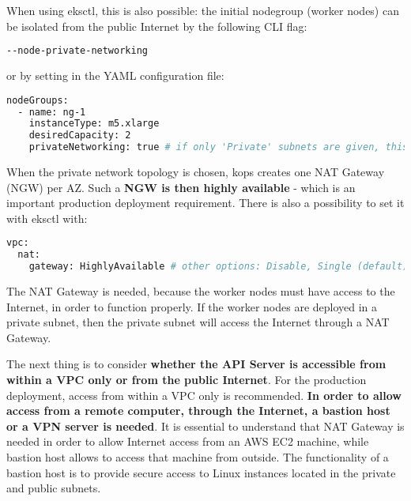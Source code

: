 When using eksctl, this is also possible: the initial nodegroup (worker nodes) can be isolated from the public Internet by the following CLI flag\cite{eksctl-net}:
\begin{lstlisting}[basicstyle=\small,caption={CLI flag used by eksctl to set private networking mode},captionpos=b,language=Bash,xleftmargin=1cm]
--node-private-networking
\end{lstlisting}
or by setting in the YAML configuration file\cite{eks-example}:
\begin{lstlisting}[basicstyle=\small,caption={YAML configuration used by Kops to set private networking mode},captionpos=b,language=Bash,xleftmargin=1cm]
nodeGroups:
  - name: ng-1
    instanceType: m5.xlarge
    desiredCapacity: 2
    privateNetworking: true # if only 'Private' subnets are given, this must be enabled
\end{lstlisting}


When the private network topology is chosen, kops creates one NAT Gateway (NGW) per AZ\cite{kops-net2}. Such a \textbf{NGW is then highly available} - which is an important production deployment requirement. There is also a possibility to set it with eksctl with\cite{eksctl-net}:
\begin{lstlisting}[basicstyle=\small,caption={YAML configuration used by eksctl to set NAT Gateway as Highly Available},captionpos=b,language=Bash,xleftmargin=1cm]
vpc:
  nat:
    gateway: HighlyAvailable # other options: Disable, Single (default)
\end{lstlisting}

The NAT Gateway is needed, because the worker nodes must have access to the Internet, in order to function properly. If the worker nodes are deployed in a private subnet, then the private subnet will access the Internet through a NAT Gateway\cite{eks-net}.


The next thing is to consider \textbf{whether the API Server is accessible from within a VPC only or from the public Internet}. For the production deployment, access from within a VPC only is recommended. \textbf{In order to allow access from a remote computer, through the Internet, a bastion host or a VPN server is needed}\cite{gruntwork-howto}. It is essential to understand that NAT Gateway is needed in order to allow Internet access from an AWS EC2 machine, while bastion host allows to access that machine from outside. The functionality of a bastion host is to provide secure access to Linux instances located in the private and public subnets\cite{aws-bastion}.

